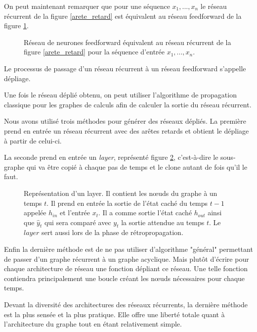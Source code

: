 On peut maintenant remarquer que pour une séquence $x_1, ..., x_n$ le réseau récurrent de la figure \ref{arete_retard} est équivalent au réseau feedforward de la figure \ref{reseau_deplie}.

\begin{figure}
\begin{center}

\caption{Réseau de neurones feedforward équivalent au réseau récurrent de la figure \ref{arete_retard} pour la séquence d'entrée $x_1, ..., x_n$.}
\label{reseau_deplie}
\end{center}
\end{figure}

Le processus de passage d'un réseau récurrent à un réseau feedforward s'appelle dépliage.

Une fois le réseau déplié obtenu, on peut utiliser l'algorithme de propagation classique pour les graphes de calculs afin de calculer la sortie du réseau récurrent.

Nous avons utilisé trois méthodes pour générer des réseaux dépliés. La première prend en entrée un réseau récurrent avec des arêtes retards et obtient le dépliage à partir de celui-ci.

La seconde prend en entrée un \textit{layer}, représenté figure \ref{layer}, c'est-à-dire le sous-graphe qui va être copié à chaque pas de temps et le clone autant de fois qu'il le faut.

\begin{figure}
\begin{center}

\caption{Représentation d'un layer. Il contient les n\oe{}uds du graphe à un temps $t$. Il prend en entrée la sortie de l'état caché du temps $t-1$ appelée $h_{in}$ et l'entrée $x_t$. Il a comme sortie l'état caché $h_{out}$ ainsi que $\hat{y}_t$ qui sera comparé avec $y_t$ la sortie attendue au temps $t$. Le $layer$ sert aussi lors de la phase de rétropropagation.}
\label{layer}
\end{center}
\end{figure}

Enfin la dernière méthode est de ne pas utiliser d'algorithme "général" permettant de passer d'un graphe récurrent à un graphe acyclique. Mais plutôt d'écrire pour chaque architecture de réseau une fonction dépliant ce réseau. Une telle fonction contiendra principalement une boucle créant les n\oe{}uds nécessaires pour chaque temps.

Devant la diversité des architectures des réseaux récurrents, la dernière méthode est la plus sensée et la plus pratique. Elle offre une liberté totale quant à l'architecture du graphe tout en étant relativement simple.


